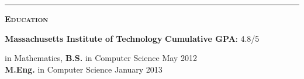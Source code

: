 \documentclass[11 pt]{article}
\begin{document}
\hrule

\begin{center}\begin{Large}\textsc{\textbf{Education}\\}\end{Large}
\end{center}

\noindent \textbf{Massachusetts Institute of Technology} \hfill \textbf{Cumulative GPA}: 4.8/5 \\
\begin{small}
 in Mathematics, {\bf B.S.} in Computer Science \hfill May 2012 \\
{\bf M.Eng.} in Computer Science \hfill January 2013 \\
\end{small}

\vspace{8 pt}

\begin{comment}
\begin{small}

 \noindent \textbf{Relevant Technical Coursework:}

\textbf{Physics}:
Physics III (Vibrations and Waves); Classical Mechanics II

 \textbf{Economics}:
 Microeconomics; %
 Networks;
 Robust Mechanism Design;
Game Theory %
Public Finance and Public Policy

 \textbf{Math}:
 \noindent Real Analysis; %
 Linear Algebra and Group Theory; %
 Differential Forms; %
 Combinatorial Analysis;
 Probability and Random Variables;
 Differential Equations;
 Seminar in Logic

\textbf{CS Theory}:
 Networks;
 Design and Analysis of Algorithms; %
 Approximation Algorithms;
 Sub-Linear Algorithms;
 Complexity Theory I and II; %
 Advanced Complexity Theory;
 Quantum Complexity Theory;
 Combinatorial Optimization;
 Cryptography I and II; %
 Modern Developments in Cryptography
 Artificial Intelligence;

 \textbf{CS Systems}:
Intro to EECS I and II;
 Computer Systems Engineering;
 Elements of Software Construction;
 Computation Structures;
 Performance Engineering of Software Systems
 \end{small} \\
\end{comment}
\end{document}
